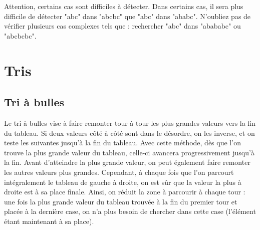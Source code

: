 \documentclass[11pt,a4paper]{article}
\begin{document}
Attention, certains cas sont difficiles à détecter.
Dans certains cas, il sera plus difficile de détecter "abc" dans "abcbc" que "abc" dans "ababc".
N'oubliez pas de vérifier plusieurs cas complexes tels que : rechercher "abc" dans "abababc" ou "abcbcbc".




\section{Tris}

\bigskip


\bigskip

\subsection{Tri à bulles}

\bigskip

Le tri à bulles vise à faire remonter tour à tour les plus grandes valeurs vers la fin du tableau.
Si deux valeurs côté à côté sont dans le désordre, on les inverse, et on teste les suivantes jusqu'à la fin du tableau.
Avec cette méthode, dès que l'on trouve la plus grande valeur du tableau, celle-ci avancera progressivement jusqu'à la fin.
Avant d'atteindre la plus grande valeur, on peut également faire remonter les autres valeurs plus grandes.
Cependant, à chaque fois que l'on parcourt intégralement le tableau de gauche à droite, on est sûr que la valeur la plus à droite est à sa place finale.
Ainsi, on réduit la zone à parcourir à chaque tour : une fois la plus grande valeur du tableau trouvée à la fin du premier tour et placée à la dernière case, on n'a plus besoin de chercher dans cette case (l'élément étant maintenant à sa place).

\clearpage

\vfillFirst
\end{document}
